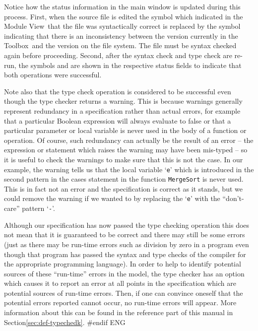 \documentclass[\pformat,12pt]{article}
\newcommand{\Toolbox}{Toolbox}
\newcommand{\vdmModView}{\guicmd{Module View}}
\newcommand{\vdmModView}{\guicmd{モジュールビュー}}
\newcommand{\Toolbox}{Toolbox}
\newcommand{\vdmModView}{\guicmd{VDM View}}
\newcommand{\vdmModView}{\guicmd{VDMビュー}}
\newcommand{\guicmd}[1]{{\sf #1}}
\newcommand{\guicmd}[1]{{\gt #1}}
\begin{document}
Notice how the status information in the main window is updated
during this process. First, when the source file is edited the symbol 
which indicated in the \vdmModView\ that the file was
syntactically correct is replaced by the symbol 
indicating that there is an inconsistency between the version
currently in the \Toolbox\ and the version on the file system. The
file must be syntax checked again before proceeding. Second, after the
syntax check and type check are re-run, the symbols 
and
are shown in the respective status fields to indicate that both
operations were successful.

Note also that the type check operation is considered to be successful
even though the type checker returns a warning. This is because
warnings generally represent redundancy in a specification rather than
actual errors, for example that a particular Boolean expression will
always evaluate to false or that a particular parameter or local
variable is never used in the body of a function or operation. Of
course, such redundancy can actually be the result of an error -- the
expression or statement which raises the warning may have been
mis-typed -- so it is useful to check the warnings to make sure that
this is not the case. In our example, the warning tells us that the
local variable `{\tt e}' which is introduced in the second pattern in
the cases statement in the function {\tt MergeSort} is never
used. This is in fact not an error and the specification is correct as
it stands, but we could remove the warning if we wanted to by
replacing the `{\tt e}' with the ``don't-care'' pattern `{\tt -}'.

Although our specification has now passed the type checking operation
this does not mean that it is guaranteed to be correct and there may
still be some errors (just as there may be run-time errors such as
division by zero in a program even though that program has passed the
syntax and type checks of the compiler for the appropriate programming
language). In order to help to identify potential sources of these
``run-time'' errors in the model, the type checker has an option which
causes it to report an error at all points in the specification which
are potential sources of run-time errors. Then, if one can convince
oneself that the potential errors reported cannot occur, no run-time
errors will appear.  More information about this can be found in the 
reference part of this manual in Section\ref{sec:def-typechedk}.
#endif ENG
\end{document}
